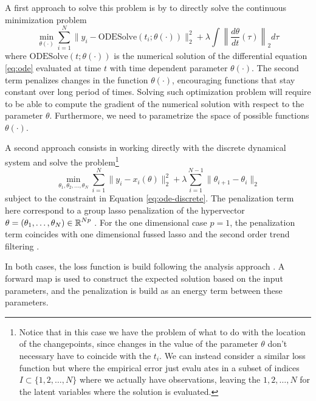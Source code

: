 A first approach to solve this problem is by to directly solve the continuous minimization problem 
\begin{equation}
    \min_{\theta(\cdot)}
    \sum_{i=1}^N
    \| y_i - \text{ODESolve}(t_i; \theta(\cdot)) \|_2^2
    + 
    \lambda 
    \int \left \| \frac{d\theta}{dt}(\tau) \right \|_2 d\tau
\end{equation}
where $\text{ODESolve}(t; \theta(\cdot))$ is the numerical solution of the differential equation \eqref{eq:ode} evaluated at time $t$ with time dependent parameter $\theta(\cdot)$.
The second term penalizes changes in the function $\theta(\cdot)$, encouraging functions that stay constant over long period of times. 
Solving such optimization problem will require to be able to compute the gradient of the numerical solution with respect to the parameter $\theta$. 
Furthermore, we need to parametrize the space of possible functions $\theta(\cdot)$.

A second approach consists in working directly with the discrete dynamical system and solve the problem\footnote{Notice that in this case we have the problem of what to do with the location of the changepoints, since changes in the value of the parameter $\theta$ don't necessary have to coincide with the $t_i$. We can instead consider a similar loss function but where the empirical error just evalu ates in a subset of indices $I \subset \{1 , 2, \ldots, N \}$ where we actually have observations, leaving the $1,2, \ldots, N$ for the latent variables where the solution is evaluated.}
\begin{equation}
    \min_{\theta_1, \theta_2, \ldots, \theta_N}
    \sum_{i=1}^N
    \| y_i - x_i(\theta) \|_2^2
    + 
    \lambda
    \sum_{i=1}^{N-1}
    \| \theta_{i+1} - \theta_i \|_2
\end{equation}
subject to the constraint in Equation \eqref{eq:ode-discrete}.
The penalization term here correspond to a group lasso penalization of the hypervector $\theta = (\theta_1, \ldots, \theta_N) \in \operatorname{\mathbb{R}}^{Np}$ \cite{hastie2015sparsity}.
For the one dimensional case $p=1$, the penalization term coincides with one dimensional fussed lasso and the second order trend filtering \cite{tibs-taylor-2011, tibs-trend-filter}.  

In both cases, the loss function is build following the analysis approach \cite{synthesis-analysis}. 
A forward map is used to construct the expected solution based on the input parameters, and the penalization is build as an energy term between these parameters. 